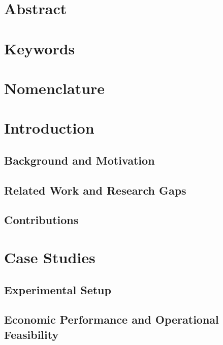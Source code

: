 \documentclass[preprint,12pt]{elsarticle}
\begin{document}
\section*{Abstract}

\section*{Keywords}

\section*{Nomenclature}

\section{Introduction}
\label{sec:introduction}

\subsection{Background and Motivation}

\subsection{Related Work and Research Gaps}

\subsection{Contributions}





\section{Case Studies}
\label{sec:case-studies}

\subsection{Experimental Setup}
\label{sec:experimental-setup}



\subsection{Economic Performance and Operational Feasibility}
\end{document}
